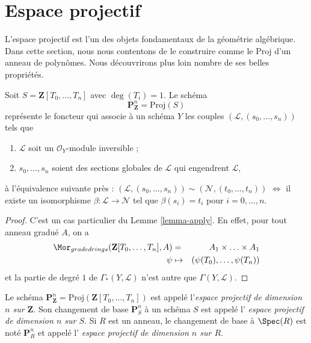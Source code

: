 \section{Espace projectif}
\label{section-projective-space}

\noindent
L'espace projectif est l'un des objets fondamentaux de la géométrie
algébrique. Dans cette section, nous nous contentons de le construire comme le
$\text{Proj}$ d'un anneau de polynômes. Nous découvrirons plus loin nombre de
ses belles propriétés.

\begin{lemma}
\label{lemma-projective-space}
Soit $S = \mathbf{Z}[T_0, \ldots, T_n]$ avec $\deg(T_i) = 1$. Le schéma
$$
\mathbf{P}^n_{\mathbf{Z}} = \text{Proj}(S)
$$
représente le foncteur qui associe à un schéma $Y$ les couples
$(\mathcal{L}, (s_0, \ldots, s_n))$ tels que
\begin{enumerate}
\item $\mathcal{L}$ soit un $\mathcal{O}_Y$-module inversible ;
\item $s_0, \ldots, s_n$ soient des
sections globales de $\mathcal{L}$ qui
engendrent $\mathcal{L}$,
\end{enumerate}
à l'équivalence suivante près :
$(\mathcal{L}, (s_0, \ldots, s_n)) \sim
(\mathcal{N}, (t_0, \ldots, t_n))$ $\Leftrightarrow$ il existe un
isomorphisme $\beta : \mathcal{L} \to \mathcal{N}$ tel que
$\beta(s_i) = t_i$ pour $i = 0, \ldots, n$.
\end{lemma}

\begin{proof}
C'est un cas particulier du Lemme \ref{lemma-apply}. En effet, pour tout
anneau gradué $A$, on a
\begin{eqnarray*}
\Mor_{graded rings}(\mathbf{Z}[T_0, \ldots, T_n], A)
& = &
A_1 \times \ldots \times A_1 \\
\psi & \mapsto & (\psi(T_0), \ldots, \psi(T_n))
\end{eqnarray*}
et la partie de degré $1$ de $\Gamma_*(Y, \mathcal{L})$ n'est autre que
$\Gamma(Y, \mathcal{L})$.
\end{proof}

\begin{definition}
\label{definition-projective-space}
Le schéma
$\mathbf{P}^n_{\mathbf{Z}} = \text{Proj}(\mathbf{Z}[T_0, \ldots, T_n])$ est
appelé l'{\it espace projectif de dimension $n$ sur $\mathbf{Z}$}.
Son changement de base $\mathbf{P}^n_S$ à un schéma $S$ est appelé l'
{\it espace projectif de dimension $n$ sur $S$}. Si $R$ est un anneau, le
changement de base à $\Spec(R)$ est noté $\mathbf{P}^n_R$ et appelé l'
{\it espace projectif de dimension $n$ sur $R$}.
\end{definition}

